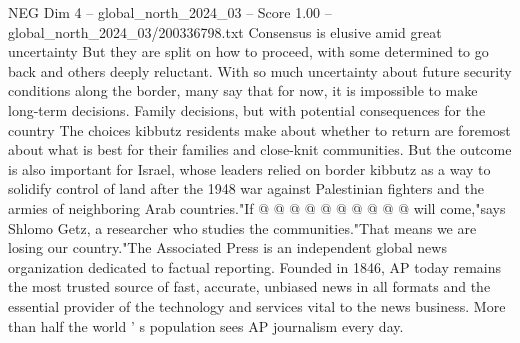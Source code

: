 \begin{textsample}{NEG Dim 4 – global\_north\_2024\_03 – Score 1.00 – global\_north\_2024\_03/200336798.txt}
Consensus is elusive amid great uncertainty But they are split on how to proceed, with some determined to go back and others deeply reluctant.
With so much uncertainty about future security conditions along the border, many say that for now, it is impossible to make long-term decisions.
Family decisions, but with potential consequences for the country The choices kibbutz residents make about whether to return are foremost about what is best for their families and close-knit communities.
But the outcome is also important for Israel, whose leaders relied on border kibbutz as a way to solidify control of land after the 1948 war against Palestinian fighters and the armies of neighboring Arab countries."If @ @ @ @ @ @ @ @ @ @ will come,"says Shlomo Getz, a researcher who studies the communities."That means we are losing our country."The Associated Press is an independent global news organization dedicated to factual reporting.
Founded in 1846, AP today remains the most trusted source of fast, accurate, unbiased news in all formats and the essential provider of the technology and services vital to the news business.
More than half the world ' s population sees AP journalism every day.

\end{textsample}
